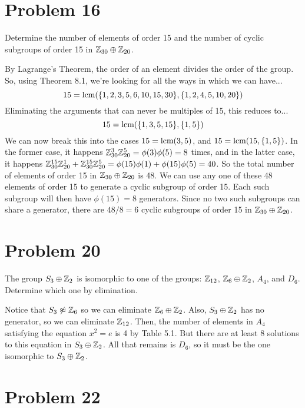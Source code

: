 \documentclass{article}
\begin{document}
\section*{Problem 16}

Determine the number of elements of order 15 and the
number of cyclic subgroups of order 15 in $\mathbb{Z}_{30}\oplus\mathbb{Z}_{20}$.

By Lagrange's Theorem, the order of an element divides the order of the group.
So, using Theorem 8.1, we're looking for all the ways in which we can have...
\begin{equation*}
15 = \mbox{lcm}(\{1,2,3,5,6,10,15,30\},\{1,2,4,5,10,20\})
\end{equation*}
Eliminating the arguments that can never be multiples of 15, this reduces to...
\begin{equation*}
15 = \mbox{lcm}(\{1,3,5,15\},\{1,5\})
\end{equation*}
We can now break this into the cases $15=\mbox{lcm}(3,5)$, and $15=\mbox{lcm}(15,\{1,5\})$.
In the former case, it happens $\mathbb{Z}_{30}^3\mathbb{Z}_{20}^5=\phi(3)\phi(5)=8$ times,
and in the latter case, it happens
$\mathbb{Z}_{30}^{15}\mathbb{Z}_{20}^1+\mathbb{Z}_{30}^{15}\mathbb{Z}_{20}^5=\phi(15)\phi(1)+\phi(15)\phi(5)=40$.
So the total number of elements of order 15 in $\mathbb{Z}_{30}\oplus\mathbb{Z}_{20}$ is 48.
We can use any one of these 48 elements of order 15 to generate a cyclic subgroup
of order 15.  Each such subgroup will then have $\phi(15)=8$ generators.
Since no two such subgroups can share a generator, there are $48/8=6$ cyclic
subgroups of order 15 in $\mathbb{Z}_{30}\oplus\mathbb{Z}_{20}$.

\section*{Problem 20}

The group $S_3\oplus\mathbb{Z}_2$ is isomorphic to one of the groups: $\mathbb{Z}_{12}$,
$\mathbb{Z}_6\oplus\mathbb{Z}_2$, $A_4$, and $D_6$.  Determine which one by elimination.

Notice that $S_3\not\approx\mathbb{Z}_6$ so we can eliminate $\mathbb{Z}_6\oplus\mathbb{Z}_2$.
Also, $S_3\oplus\mathbb{Z}_2$ has no generator, so we can eliminate $\mathbb{Z}_{12}$.
Then, the number of elements in $A_4$ satisfying the equation $x^2=e$
is 4 by Table 5.1.  But there are at least 8 solutions to this equation
in $S_3\oplus\mathbb{Z}_2$.  All that remains is $D_6$, so it must be the one
isomorphic to $S_3\oplus\mathbb{Z}_2$.

\section*{Problem 22}
\end{document}
